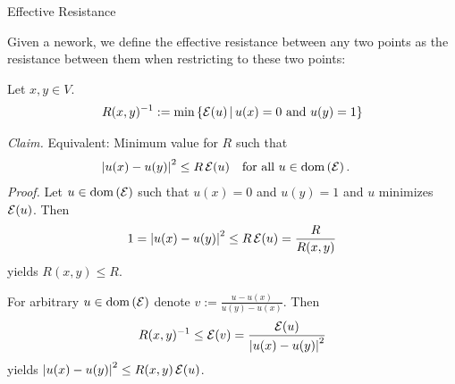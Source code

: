 \begin{frame}[allowframebreaks=.95]{Effective Resistance}
    
    Given a nework, we define the effective resistance between any two points as the resistance between them when restricting to these two points:
    
    \begin{definition}
    Let $x,y \in V$.
        \begin{align*}
            R(x,y)^{-1} := \min \left\{ \mathcal{E}(u) \,\middle\vert\, u(x)=0 \text{ and } u(y)=1 \right\} 
        \end{align*}
    \end{definition}

    \textit{Claim.} Equivalent: Minimum value for $R$ such that
    \begin{align*}
        \left\vert u(x) - u(y) \right\vert^{2} &\leq R\, \mathcal{E}(u) && \text{for all } u \in \mathrm{dom}\left( \mathcal{E} \right).
    \end{align*}
    \textit{Proof.} Let $u\in \mathrm{dom}\left( \mathcal{E} \right)$ such that $u(x)=0$ and $u(y)=1$ and $u$ minimizes $\mathcal{E}(u)$. Then
    \begin{align*}
        1 = \left\vert u(x) - u(y) \right\vert^{2} \leq R\, \mathcal{E}(u) = \frac{R}{R(x,y)}
    \end{align*}
    yields $R(x,y) \leq R$.

    For arbitrary $u \in \mathrm{dom}\left( \mathcal{E} \right)$ denote $v := \frac{u - u(x)}{u(y)-u(x)}$.
    Then
    \begin{align*}
        R(x,y)^{-1} \leq \mathcal{E}(v) = \frac{\mathcal{E}(u)}{\left\vert u(x)-u(y) \right\vert^{2}}
    \end{align*}
    yields $\left\vert u(x)-u(y) \right\vert^{2} \leq R(x,y)\,\mathcal{E}(u)$.
\end{frame}

